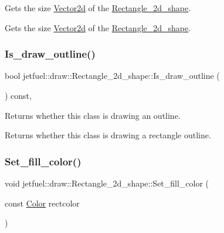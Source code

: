 Gets the size \hyperlink{classjetfuel_1_1draw_1_1Vector2d}{Vector2d} of the \hyperlink{classjetfuel_1_1draw_1_1Rectangle__2d__shape}{Rectangle\+\_\+2d\+\_\+shape}. 

Gets the size \hyperlink{classjetfuel_1_1draw_1_1Vector2d}{Vector2d} of the \hyperlink{classjetfuel_1_1draw_1_1Rectangle__2d__shape}{Rectangle\+\_\+2d\+\_\+shape}. \mbox{\label{classjetfuel_1_1draw_1_1Rectangle__2d__shape_a10cb5ef4b0d1b10b9d1b1bf32a805613}} 
\subsubsection{\texorpdfstring{Is\+\_\+draw\+\_\+outline()}{Is\_draw\_outline()}}
{\footnotesize\ttfamily bool jetfuel\+::draw\+::\+Rectangle\+\_\+2d\+\_\+shape\+::\+Is\+\_\+draw\+\_\+outline (\begin{DoxyParamCaption}{ }\end{DoxyParamCaption}) const\hspace{0.3cm}{\ttfamily [inline]}, {\ttfamily [protected]}}



Returns whether this class is drawing an outline. 

Returns whether this class is drawing a rectangle outline. \mbox{\label{classjetfuel_1_1draw_1_1Rectangle__2d__shape_a2dfd78b34c5d1742ca2e41b86c7f9d12}} 
\subsubsection{\texorpdfstring{Set\+\_\+fill\+\_\+color()}{Set\_fill\_color()}}
{\footnotesize\ttfamily void jetfuel\+::draw\+::\+Rectangle\+\_\+2d\+\_\+shape\+::\+Set\+\_\+fill\+\_\+color (\begin{DoxyParamCaption}\item[{const \hyperlink{classjetfuel_1_1draw_1_1Color}{Color}}]{rectcolor }\end{DoxyParamCaption})\hspace{0.3cm}{\ttfamily [inline]}}



